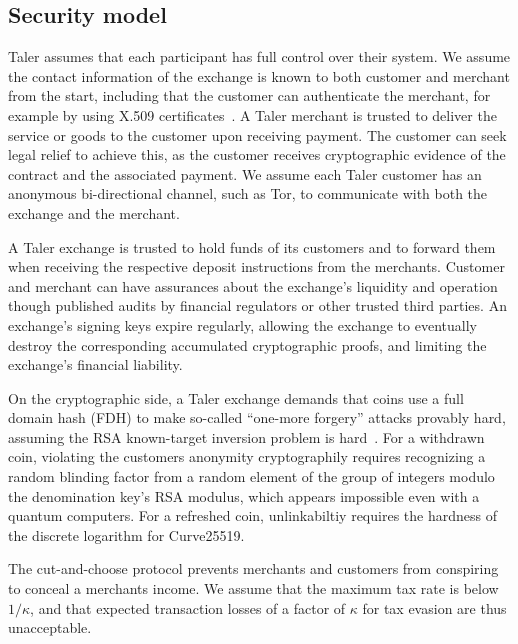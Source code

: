 \documentclass{llncs}
\begin{document}
\subsection{Security model}

Taler assumes that each participant has full control over their
system.  We assume the contact information of the exchange is known to
both customer and merchant from the start, including that the customer
can authenticate the merchant, for example by using X.509
certificates~\cite{rfc6818}.  A Taler merchant is trusted to deliver
the service or goods to the customer upon receiving payment.  The
customer can seek legal relief to achieve this, as the customer
receives cryptographic evidence of the contract and the associated
payment.  We assume each Taler customer has an anonymous
bi-directional channel, such as Tor, to communicate with both the
exchange and the merchant.

A Taler exchange is trusted to hold funds of its customers and to
forward them when receiving the respective deposit instructions from
the merchants.  Customer and merchant can have assurances about the
exchange's liquidity and operation though published audits by
financial regulators or other trusted third parties.  An exchange's
signing keys expire regularly, allowing the exchange to eventually
destroy the corresponding accumulated cryptographic proofs, and
limiting the exchange's financial liability.

On the cryptographic side, a Taler exchange demands that coins use a
full domain hash (FDH) to make so-called ``one-more forgery'' attacks
provably hard, assuming the RSA known-target inversion problem is
hard~\cite[Theorem 12]{RSA-HDF-KTIvCTI}.  For a withdrawn coin,
violating the customers anonymity cryptographily requires recognizing
a random blinding factor from a random element of the group of
integers modulo the denomination key's RSA modulus, which appears
impossible even with a quantum computers.  For a refreshed coin,
unlinkabiltiy requires the hardness of the discrete logarithm for
Curve25519.

The cut-and-choose protocol prevents merchants and customers from
conspiring to conceal a merchants income.  We assume that the maximum
tax rate is below $1/\kappa$, and that expected transaction losses of
a factor of $\kappa$ for tax evasion are thus unacceptable.
\end{document}
